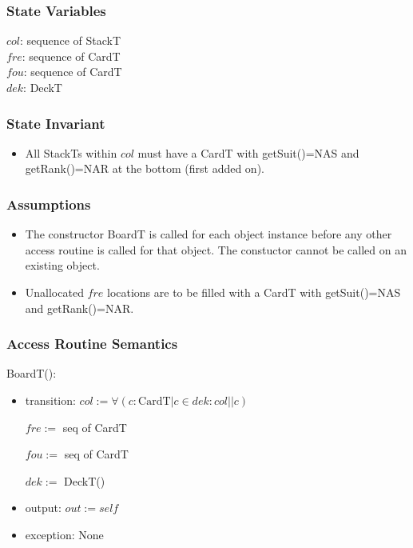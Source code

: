 \documentclass[12pt]{article}
\newcommand{\m}[1]{\mbox{#1}}
\begin{document}
\subsubsection* {State Variables}

$col$: sequence of StackT\\
$fre$: sequence of CardT\\
$fou$: sequence of CardT\\
$dek$: DeckT\\

\subsubsection* {State Invariant}

\begin{itemize}
  \item All StackTs within $col$ must have a CardT with getSuit()=\m{NAS}
  and getRank()=\m{NAR} at the bottom (first added on).
\end{itemize}

\subsubsection* {Assumptions}

\begin{itemize}
    \item The constructor BoardT is called for each object instance
    before any other access routine is called for that object. The
    constuctor cannot be called on an existing object.
    \item Unallocated $fre$ locations are to be filled with a CardT with
    getSuit()=\m{NAS} and getRank()=\m{NAR}.
\end{itemize}

\subsubsection* {Access Routine Semantics}

BoardT():
\begin{itemize}
    \item transition: $col := \forall(c : \mbox{CardT} | c \in dek : col||c)$

    \hspace{1.8cm} $fre :=$ seq of CardT

    \hspace{1.8cm} $fou :=$ seq of CardT

    \hspace{1.8cm} $dek :=$ DeckT()
    \item output: $out := \mathit{self}$
    \item exception: None
\end{itemize}
\end{document}
